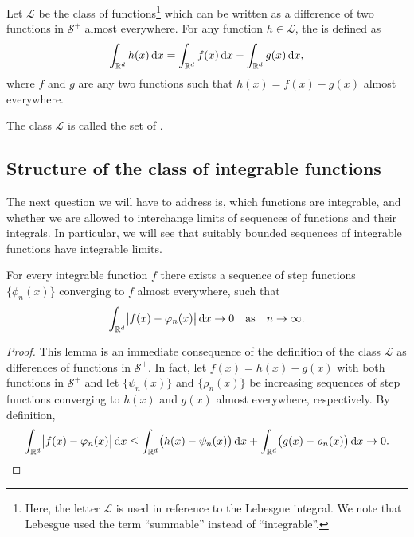 \begin{definition}
  Let $\mathcal L$ be the class of functions\footnote{Here, the letter
    $\mathcal L$ is used in reference to the Lebesgue integral. We
    note that Lebesgue used the term ``summable'' instead of
    ``integrable''.} which can be written as a difference of two
  functions in $\mathcal S^+$ almost everywhere. For any function
  $h\in \mathcal L$, the  is defined as
  \begin{gather*}
    \int_{\mathbb R^d} h(x)\,\mathrm{d} x = \int_{\mathbb R^d} f(x)\,\mathrm{d} x - \int_{\mathbb R^d} g(x)\,\mathrm{d} x,
  \end{gather*}
  where $f$ and $g$ are any two functions such that $h(x) = f(x) -
  g(x)$ almost everywhere.
  
  The class $\mathcal L$ is called the set of .
\end{definition}

\subsection{Structure of the class of integrable functions}

\begin{intro}
  The next question we will have to address is, which functions are
  integrable, and whether we are allowed to interchange limits of
  sequences of functions and their integrals. In particular, we will
  see that suitably bounded sequences of integrable functions have
  integrable limits.
\end{intro}

\begin{lemma}
  For every integrable function $f$ there exists a sequence of step
  functions $\{\phi_n(x)\}$ converging to $f$ almost everywhere, such
  that
  \begin{gather*}
    \int_{\mathbb R^d} \bigl|f(x)-\varphi_n(x)\bigr|\,\mathrm{d} x \to 0
    \quad\text{as}\quad n\to \infty.
  \end{gather*}
\end{lemma}

\begin{proof}
  This lemma is an immediate consequence of the definition of the
  class $\mathcal L$ as differences of functions in $\mathcal S^+$. In
  fact, let $f(x) = h(x)-g(x)$ with both functions in $\mathcal
  S^+$ and let $\{\psi_n(x)\}$ and $\{\rho_n(x)\}$ be increasing
  sequences of step functions converging to $h(x)$ and $g(x)$
  almost everywhere, respectively. By definition,
  \begin{gather*}
    \int_{\mathbb R^d} \bigl|f(x)-\varphi_n(x)\bigr|\,\mathrm{d} x
    \le \int_{\mathbb R^d} \bigl(h(x)-\psi_n(x)\bigr)\,\mathrm{d} x
    + \int_{\mathbb R^d} \bigl(g(x)-\varrho_n(x)\bigr)\,\mathrm{d} x
    \to 0.
  \end{gather*}
\end{proof}

